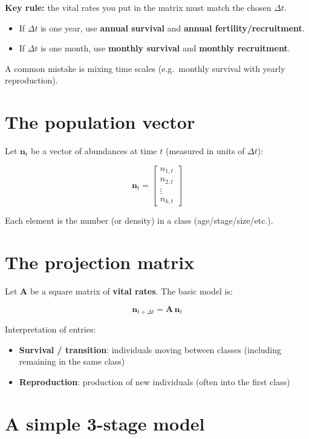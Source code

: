 \documentclass[
  a4paper]{book}
\providecommand{\tightlist}{%
  \setlength{\itemsep}{0pt}\setlength{\parskip}{0pt}}
\begin{document}
\textbf{Key rule:} the vital rates you put in the matrix must match the chosen \(\Delta t\).

\begin{itemize}
\tightlist
\item
  If \(\Delta t\) is one year, use \textbf{annual survival} and \textbf{annual fertility/recruitment}.
\item
  If \(\Delta t\) is one month, use \textbf{monthly survival} and \textbf{monthly recruitment}.
\end{itemize}

A common mistake is mixing time scales (e.g.~monthly survival with yearly reproduction).

\section{The population vector}\label{the-population-vector}

Let \(\mathbf{n}_t\) be a vector of abundances at time \(t\) (measured in units of \(\Delta t\)):

\[
\mathbf{n}_t =
\begin{bmatrix}
n_{1,t} \\
n_{2,t} \\
\vdots \\
n_{k,t}
\end{bmatrix}
\]

Each element is the number (or density) in a class (age/stage/size/etc.).

\section{The projection matrix}\label{the-projection-matrix}

Let \(\mathbf{A}\) be a square matrix of \textbf{vital rates}. The basic model is:

\[
\mathbf{n}_{t+\Delta t} = \mathbf{A}\,\mathbf{n}_t
\]

Interpretation of entries:

\begin{itemize}
\tightlist
\item
  \textbf{Survival / transition}: individuals moving between classes (including remaining in the same class)
\item
  \textbf{Reproduction}: production of new individuals (often into the first class)
\end{itemize}

\section{A simple 3-stage model}\label{a-simple-3-stage-model}
\end{document}
